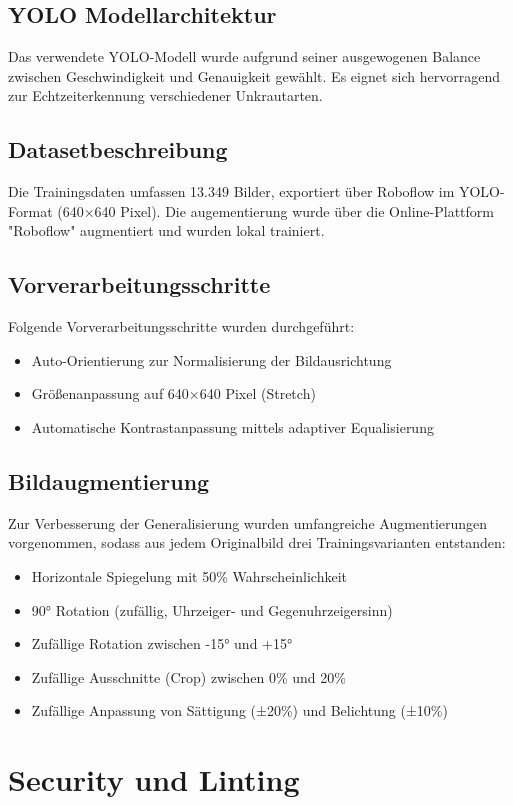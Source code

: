 \documentclass[12pt, a4paper]{scrreprt}
\begin{document}
\section{YOLO Modellarchitektur}
Das verwendete YOLO-Modell wurde aufgrund seiner ausgewogenen Balance zwischen Geschwindigkeit und Genauigkeit gewählt. Es eignet sich hervorragend zur Echtzeiterkennung verschiedener Unkrautarten.

\section{Datasetbeschreibung}
Die Trainingsdaten umfassen 13.349 Bilder, exportiert über Roboflow im YOLO-Format (640×640 Pixel). Die augementierung wurde über die Online-Plattform "Roboflow" augmentiert und wurden lokal trainiert.

\section{Vorverarbeitungsschritte}
Folgende Vorverarbeitungsschritte wurden durchgeführt:
\begin{itemize}
    \item Auto-Orientierung zur Normalisierung der Bildausrichtung
    \item Größenanpassung auf 640×640 Pixel (Stretch)
    \item Automatische Kontrastanpassung mittels adaptiver Equalisierung
\end{itemize}

\section{Bildaugmentierung}
Zur Verbesserung der Generalisierung wurden umfangreiche Augmentierungen vorgenommen, sodass aus jedem Originalbild drei Trainingsvarianten entstanden:
\begin{itemize}
    \item Horizontale Spiegelung mit 50\% Wahrscheinlichkeit
    \item 90° Rotation (zufällig, Uhrzeiger- und Gegenuhrzeigersinn)
    \item Zufällige Rotation zwischen -15° und +15°
    \item Zufällige Ausschnitte (Crop) zwischen 0\% und 20\%
    \item Zufällige Anpassung von Sättigung (±20\%) und Belichtung (±10\%)
\end{itemize}

\chapter{Security und Linting}
\end{document}
